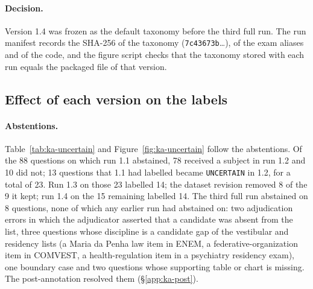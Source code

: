 \paragraph{Decision.} Version 1.4 was frozen as the default taxonomy before
the third full run. The run manifest records the SHA-256 of the taxonomy
(\texttt{7c43673b}\ldots), of the exam aliases and of the code, and the
figure script checks that the taxonomy stored with each run equals the
packaged file of that version.

\subsection{Effect of each version on the labels}
\label{app:ka-effect}

\paragraph{Abstentions.} Table~\ref{tab:ka-uncertain} and
Figure~\ref{fig:ka-uncertain} follow the abstentions. Of the 88 questions on
which run 1.1 abstained, 78 received a subject in run 1.2 and 10 did not;
13 questions that 1.1 had labelled became \texttt{UNCERTAIN} in 1.2, for a
total of 23. Run 1.3 on those 23 labelled 14; the dataset revision removed 8
of the 9 it kept; run 1.4 on the 15 remaining labelled 14. The third full
run abstained on 8 questions, none of which any earlier run had abstained on:
two adjudication errors in which the adjudicator asserted that a candidate
was absent from the list, three questions whose discipline is a candidate gap
of the vestibular and residency lists (a Maria da Penha law item in ENEM, a
federative-organization item in COMVEST, a health-regulation item in a
psychiatry residency exam), one boundary case and two questions whose
supporting table or chart is missing. The post-annotation resolved them
(\S\ref{app:ka-post}).

